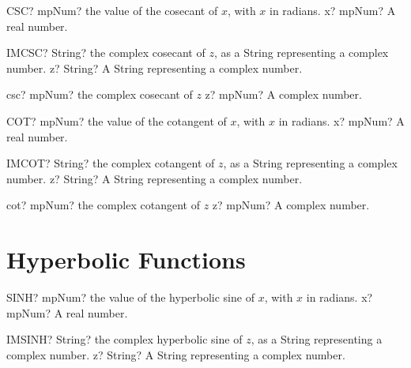 \documentclass[12pt,a4paper,openany]{book}
\begin{document}
\begin{mpFunctionsExtract}
\mpWorksheetFunctionOneNotImplemented
{CSC? mpNum? the value of the cosecant of $x$, with $x$ in radians.}
{x? mpNum? A real number.}
\end{mpFunctionsExtract}

\begin{mpFunctionsExtract}
\mpWorksheetFunctionOneNotImplemented
{IMCSC? String? the complex cosecant of $z$, as a String representing a complex number.}
{z? String? A String representing a complex number.}
\end{mpFunctionsExtract}

\begin{mpFunctionsExtract}
\mpFunctionOne
{csc? mpNum? the complex cosecant of $z$}
{z? mpNum? A complex number.}
\end{mpFunctionsExtract}

\begin{mpFunctionsExtract}
\mpWorksheetFunctionOneNotImplemented
{COT? mpNum? the value of the cotangent of $x$, with $x$ in radians.}
{x? mpNum? A real number.}
\end{mpFunctionsExtract}

\begin{mpFunctionsExtract}
\mpWorksheetFunctionOneNotImplemented
{IMCOT? String? the complex cotangent of $z$, as a String representing a complex number.}
{z? String? A String representing a complex number.}
\end{mpFunctionsExtract}

\begin{mpFunctionsExtract}
\mpFunctionOne
{cot? mpNum? the complex cotangent of $z$}
{z? mpNum? A complex number.}
\end{mpFunctionsExtract}

\section{Hyperbolic Functions}

\begin{mpFunctionsExtract}
\mpWorksheetFunctionOneNotImplemented
{SINH? mpNum? the value of the hyperbolic sine of $x$, with $x$ in radians.}
{x? mpNum? A real number.}
\end{mpFunctionsExtract}

\begin{mpFunctionsExtract}
\mpWorksheetFunctionOneNotImplemented
{IMSINH? String? the complex hyperbolic sine of $z$, as a String representing a complex number.}
{z? String? A String representing a complex number.}
\end{mpFunctionsExtract}
\end{document}
